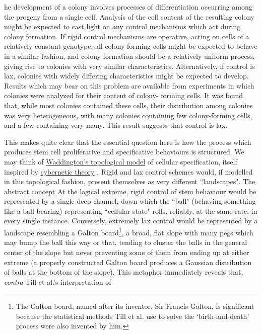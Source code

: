 \begin{longquote}
[T]he development of a colony involves processes of differentiation occurring among the progeny from a single cell. Analysis of the cell
content of the resulting colony might be expected to cast light on any control
mechanisms which act during colony formation. If rigid control mechanisms are
operative, acting on cells of a relatively constant genotype, all colony-forming cells
might be expected to behave in a similar fashion, and colony formation should be
a relatively uniform process, giving rise to colonies with very similar characteristics.
Alternatively, if control is lax, colonies with widely differing characteristics might
be expected to develop. Results which may bear on this problem are available
from experiments in which colonies were analyzed for their content of colony-
forming cells. It was found that, while most colonies contained these cells,
their distribution among colonies was very heterogeneous, with many colonies
containing few colony-forming cells, and a few containing very many. This result
suggests that control is lax.
\cite{Till1964}
\end{longquote}

This makes quite clear that the essential question here is how the process which produces stem cell proliferative and specificative behaviours is structured. We may think of \hyperref[Waddington]{Waddington's topological model} of cellular specification, itself inspired by \hyperref[cybernetics]{cybernetic theory} \label{TMSmodel3}. Rigid and lax control schemes would, if modelled in this topological fashion, present themselves as very different ``landscapes". The abstract concept At the logical extreme, rigid control of stem behaviour would be represented by a single deep channel, down which the ``ball" (behaving something like a ball bearing) representing ``cellular state" rolls, reliably, at the same rate, in every single instance. Conversely, extremely lax control would be represented by a landscape resembling a Galton board\footnote{The Galton board, named after its inventor, Sir Francis Galton, is significant because the statistical methods Till et al. use to solve the `birth-and-death' process were also invented by him.}, a broad, flat slope with many pegs which may bump the ball this way or that, tending to cluster the balls in the general center of the slope but never preventing some of them from ending up at either extreme (a properly constructed Galton board produces a Gaussian distribution of balls at the bottom of the slope). This metaphor immediately reveals that, \textit{contra} Till et al.'s interpretation of 

